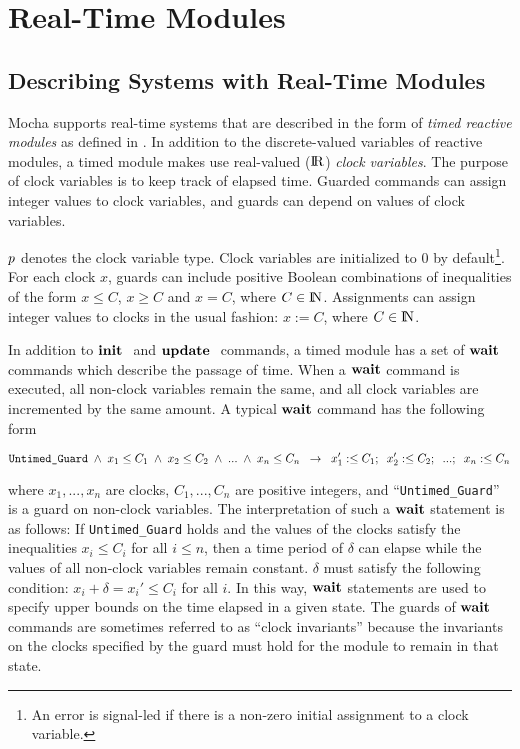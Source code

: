 \section{Real-Time Modules}
\label{sec:rtm}

\subsection{Describing Systems with Real-Time Modules}
{\sc Mocha} supports real-time systems that are
described in the form of {\em timed reactive modules} as defined in
\cite{timed-modules}. In addition to the discrete-valued variables of
reactive modules, a timed module makes use real-valued (${\rm I\!R}$) {\em clock
variables}. The purpose of clock variables is to keep track of
elapsed time. Guarded commands can assign integer values to clock
variables, and guards can depend on values of clock variables. 

$p$ denotes the clock variable type. Clock variables
are initialized to $0$ by default\footnote{
An error is signal-led if there is a non-zero initial assignment to a
clock variable.}. For each clock $x$, guards can include positive
Boolean combinations of inequalities of the form $x \le C$, $x \ge C$
and $x=C$, where $C \in {\rm I\!N}$. Assignments can assign integer values
to clocks in the usual fashion: $x := C$, where $C \in {\rm I\!N}$.

In addition to $\hbox{\bf init~}$ and $\hbox{\bf update~}$ commands, a timed module has a
set of ${\bf wait}$ commands which describe the passage of time. When a
${\bf wait}$ command is executed, all non-clock variables remain the same,
and all clock variables are incremented by the same amount. A typical
${\bf wait}$ command has the following form

$$ \mbox{{\tt Untimed\_Guard}} \;\land\; x_1 \le C_1 \;\land\; x_2 \le C_2 \;\land\;
... \;\land\; x_n \le C_n \;\;\rightarrow\;\; x_1':\le C_1 ;\;\; x_2' :\le C_2 ;\;\;
... ;\;\; x_n :\le C_n $$

\noindent where $x_1,...,x_n$ are clocks, $C_1,...,C_n$ are positive
integers, and ``{\tt Untimed\_Guard}'' is a guard on non-clock
variables. The interpretation of such a ${\bf wait}$ statement is as
follows: If {\tt Untimed\_Guard} holds and the values of the clocks
satisfy the inequalities $x_i \le C_i$ for all $i \le n$, then a time
period of $\delta$ can elapse while the values of all non-clock
variables remain constant. $\delta$ must satisfy the following condition:
$x_i + \delta = x_i' \le C_i$ for all $i$. In this way, ${\bf wait}$
statements are used to specify upper bounds on the time elapsed in a
given state. The guards of ${\bf wait}$ commands are sometimes referred to
as ``clock invariants'' because the invariants on the clocks specified
by the guard must hold for the module to remain in that state.

